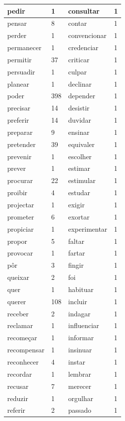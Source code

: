 \documentclass[output=paper,colorlinks,citecolor=brown]{langscibook}
\begin{document}
\begin{longtable}{ p{3cm} | p{1cm} | p{3cm} | p{1cm} }
		pedir & 1 & consultar & 1\\\hline
		pensar & 8 & contar & 1\\\hline
		perder & 1 & convencionar & 1\\\hline
		permanecer & 1 & credenciar & 1\\\hline
		permitir & 37 & criticar & 1\\\hline
		persuadir & 1 & culpar & 1\\\hline
		planear & 1 & declinar & 1\\\hline
		poder & 398 & depender & 1\\\hline
		precisar & 14 & desistir & 1\\\hline
		preferir & 14 & duvidar & 1\\\hline
		preparar & 9 & ensinar & 1\\\hline
		pretender & 39 & equivaler & 1\\\hline
		prevenir & 1 & escolher & 1\\\hline
		prever & 1 & estimar & 1\\\hline
		procurar & 22 & estimular & 1\\\hline
		proibir & 4 & estudar & 1\\\hline
		projectar & 1 & exigir & 1\\\hline
		prometer & 6 & exortar & 1\\\hline
		propiciar & 1 & experimentar & 1\\\hline
		propor & 5 & faltar & 1\\\hline
		provocar & 1 & fartar & 1\\\hline
		pôr & 3 & fingir & 1\\\hline
		queixar & 2 & foi & 1\\\hline
		quer & 1 & habituar & 1\\\hline
		querer & 108 & incluir & 1\\\hline
		receber & 2 & indagar & 1\\\hline
		reclamar & 1 & influenciar & 1\\\hline
		recomeçar & 1 & informar & 1\\\hline
		recompensar & 1 & insinuar & 1\\\hline
		reconhecer & 4 & instar & 1\\\hline
		recordar & 1 & lembrar & 1\\\hline
		recusar & 7 & merecer & 1\\\hline
		reduzir & 1 & orgulhar & 1\\\hline
		referir & 2 & passado & 1\\\hline

\end{longtable}
\end{document}
